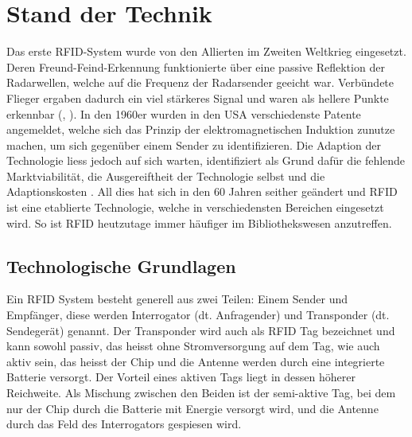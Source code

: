 \chapter{Stand der Technik}
\label{ch:StandDerTechnik}

Das erste \gls{RFID}-System wurde von den Allierten im Zweiten Weltkrieg eingesetzt. Deren Freund-Feind-Erkennung funktionierte über eine passive Reflektion der Radarwellen, welche auf die Frequenz der Radarsender geeicht war. Verbündete Flieger ergaben dadurch ein viel stärkeres Signal und waren als hellere Punkte erkennbar (\cite{chawla2007}, \cite{uswardep1946_3}). In den 1960er wurden in den USA verschiedenste Patente angemeldet, welche sich das Prinzip der elektromagnetischen Induktion zunutze machen, um sich gegenüber einem Sender zu identifizieren. Die Adaption der Technologie liess jedoch auf sich warten, \citeauthor{want2004} identifiziert als Grund dafür die fehlende Marktviabilität, die Ausgereiftheit der Technologie selbst und die Adaptionskosten \parencite{want2004}. All dies hat sich in den 60 Jahren seither geändert und \gls{RFID} ist eine etablierte Technologie, welche in verschiedensten Bereichen eingesetzt wird. So ist \gls{RFID} heutzutage immer häufiger im Bibliothekswesen anzutreffen.

\section{Technologische Grundlagen}

Ein \gls{RFID} System besteht generell aus zwei Teilen: Einem Sender und Empfänger, diese werden Interrogator (dt. Anfragender) und Transponder (dt. Sendegerät) genannt. Der Transponder wird auch als \gls{RFID} Tag bezeichnet und kann sowohl passiv, das heisst ohne Stromversorgung auf dem Tag, wie auch aktiv sein, das heisst der Chip und die Antenne werden durch eine integrierte Batterie versorgt. Der Vorteil eines aktiven Tags liegt in dessen höherer Reichweite. Als Mischung zwischen den Beiden ist der semi-aktive Tag, bei dem nur der Chip durch die Batterie mit Energie versorgt wird, und die Antenne durch das Feld des Interrogators gespiesen wird.

